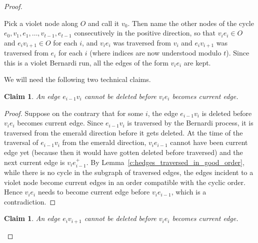 \documentclass[10pt]{amsart}
\newtheorem{claim}[theo]{Claim}
\theoremstyle{definition}\newtheorem{defi}[theo]{Definition}
\theoremstyle{remark}\newtheorem{rema}[theo]{Remark}
\begin{document}
\begin{proof}
\begin{center}
\end{center}

Pick a violet node along $O$ and call it $v_0$. Then name the other nodes of the cycle $e_0, v_1, e_1, \dots, v_{t-1}, e_{t-1}$ consecutively in the positive direction, \ie so that $v_ie_i\in O$ and $e_iv_{i+1}\in O$ for each $i$, and $v_ie_i$ was traversed from $v_i$ and $e_iv_{i+1}$ was traversed from $e_i$ for each $i$ (where indices are now understood modulo $t$). Since this is a violet Bernardi run, all the edges of the form $v_ie_i$ are kept.

We will need the following two technical claims.

\begin{claim}\label{c:Ber_cycle_cl0}
An edge $e_{i-1}v_{i}$ cannot be deleted before $v_ie_i$ becomes current edge.
\end{claim}

\begin{proof}
Suppose on the contrary that for some $i$, the edge $e_{i-1}v_{i}$ is deleted before $v_ie_i$ becomes current edge. Since $e_{i-1}v_{i}$ is traversed by the Bernardi process, it is traversed from the emerald direction before it gets deleted. At the time of the traversal of $e_{i-1}v_{i}$ from the emerald direction, $v_ie_{i-1}$ cannot have been current edge yet (because then it would have gotten deleted before traversed) and the next current edge is $v_{i}e_{i-1}^+$. By Lemma~\ref{c:hedges_traversed_in_good_order}, while there is no cycle in the subgraph of traversed edges, the edges incident to a violet node become current edges in an order compatible with the cyclic order. Hence $v_{i}e_ {i}$ needs to become current edge before $v_{i}e_{i-1}$, which is a contradiction.
\end{proof}

\begin{claim}\label{c:Ber_cycle_cl1}
An edge $e_iv_{i+1}$ cannot be deleted before $v_ie_i$ becomes current edge.
\end{claim}


\end{proof}
\end{document}
